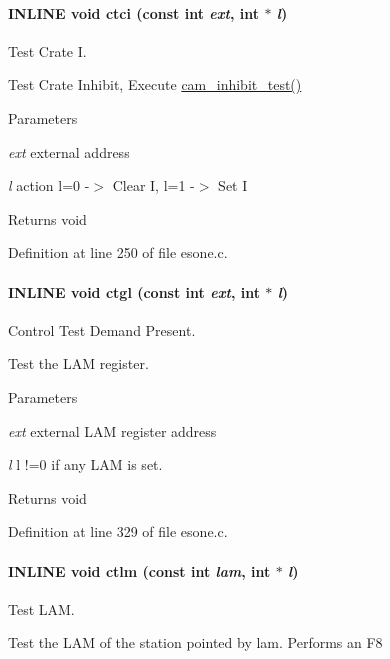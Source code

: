 \paragraph[{ctci}]{\setlength{\rightskip}{0pt plus 5cm}INLINE void ctci (const int {\em ext}, \/  int $\ast$ {\em l})}\hfill\label{esone_8c_afb286ebf60cf9e998ad5cb1c4c9c0a8d}
Test Crate I.

Test Crate Inhibit, Execute \hyperlink{group__mcstdfunctionh_ga9bf24cf17380c556bda27c53c7bfb248}{cam\_\-inhibit\_\-test()}


\begin{DoxyParams}{Parameters}
\item[{\em ext}]external address \item[{\em l}]action l=0 -\/$>$ Clear I, l=1 -\/$>$ Set I \end{DoxyParams}
\begin{DoxyReturn}{Returns}
void 
\end{DoxyReturn}


Definition at line 250 of file esone.c.
\paragraph[{ctgl}]{\setlength{\rightskip}{0pt plus 5cm}INLINE void ctgl (const int {\em ext}, \/  int $\ast$ {\em l})}\hfill\label{esone_8c_a9226f10235880c5b374d2550a26e03ea}
Control Test Demand Present.

Test the LAM register.


\begin{DoxyParams}{Parameters}
\item[{\em ext}]external LAM register address \item[{\em l}]l !=0 if any LAM is set. \end{DoxyParams}
\begin{DoxyReturn}{Returns}
void 
\end{DoxyReturn}


Definition at line 329 of file esone.c.
\paragraph[{ctlm}]{\setlength{\rightskip}{0pt plus 5cm}INLINE void ctlm (const int {\em lam}, \/  int $\ast$ {\em l})}\hfill\label{esone_8c_afb7daf2480c1df634658aebb91ab94c5}
Test LAM.

Test the LAM of the station pointed by lam. Performs an F8


